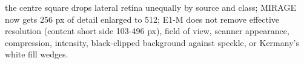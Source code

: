 the centre square drops lateral retina unequally by source and class; MIRAGE now gets 256 px of detail enlarged to 512; E1-M does not remove effective resolution (content short side 103-496 px), field of view, scanner appearance, compression, intensity, black-clipped background against speckle, or Kermany's white fill wedges.
